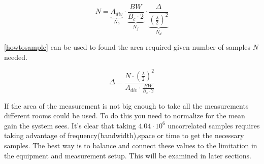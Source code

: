 \begin{equation}
N = \underbrace{A_{div}}_\text{$N_a$} \cdot \underbrace{\frac{BW}{B_c \cdot 2}}_\text{$N_f$} \cdot \underbrace{\frac{\Delta}{(\frac{\lambda}{2})^2}}_\text{$N_d$}
\label{howtosample}
\end{equation} 
 
\begin{where}
\end{where} 
 

\autoref{howtosample} can be used to found the area required given number of samples $N$ needed.

\begin{equation}
\Delta  = \frac{N\cdot (\frac{\lambda}{2})^2}{A_{div}\cdot \frac{BW}{B_c \cdot 2}}
\label{howtosqaure}
\end{equation}

If the area of the measurement is not big enough to take all the measurements different rooms could be used. To do this you need to normalize for the mean gain the system sees. It's clear that taking $4.04\cdot10^6$  uncorrelated samples requires taking advantage of  frequency(bandwidth),space or time to get the necessary samples. The best way is to balance and connect these values to the limitation in the equipment and measurement setup. This will be examined in later sections. 

